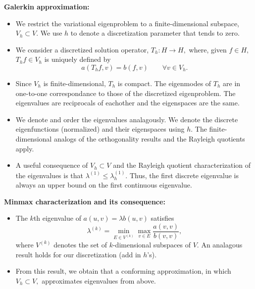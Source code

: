 \documentclass[12pt,a4paper]{article}
\theoremstyle{boldthm}
\theoremstyle{bolddefn}
\begin{document}
\textbf{Galerkin approximation:}
\begin{itemize}
    \item We restrict the variational eigenproblem to a finite-dimensional subspace, $V_h \subset V.$ We use $h$ to denote a discretization parameter that tends to zero. 
    \item We consider a discretized solution operator, $T_h : H \rightarrow H,$ where, given $f \in H,$ $T_h f \in V_h$ is uniquely defined by 
    $$ a(T_hf, v) = b(f, v) \qquad \forall v \in V_h.$$

    \item Since $V_h$ is finite-dimensional, $T_h$ is compact. The eigenmodes of $T_h$ are in one-to-one correspondance to those of the discretized eigenproblem. The eigenvalues are reciprocals of eachother and the eigenspaces are the same. 

    \item We denote and order the eigenvalues analagously. We denote the discrete eigenfunctions (normalized) and their eigenspaces using $h.$ The finite-dimensional analogs of the orthogonality results and the Rayleigh quotients apply.

    \item A useful consequence of $V_h \subset V$ and the Rayleigh quotient characterization of the eigenvalues is that $\lambda^{(1)} \le \lambda_h^{(1)}.$ Thus, the first discrete eigenvalue is always an upper bound on the first continuous eigenvalue. 
\end{itemize}

\textbf{Minmax characterization and its consequence:}
\begin{itemize}
    \item The $k$th eigenvalue of $a(u,v) = \lambda b(u,v)$ satisfies 
    $$\lambda^{(k)} = \min_{E \in V^{(k)}} \max_{v \in E} \frac{a(v,v)}{b(v,v)},$$
    where $V^{(k)}$ denotes the set of $k$-dimensional subspaces of $V.$ An analagous result holds for our discretization (add in $h$'s).
    \item From this result, we obtain that a conforming approximation, in which $V_h \subset V,$ approximates eigenvalues from above. 
\end{itemize}
\end{document}

